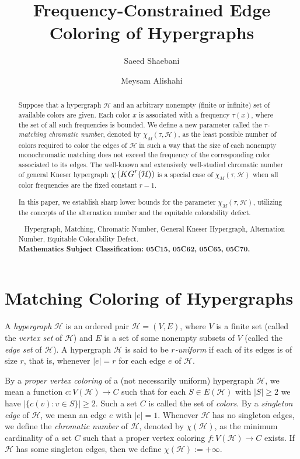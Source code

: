 \documentclass[11pt]{amsart}
\title{Frequency-Constrained Edge Coloring of Hypergraphs}
\author{Saeed Shaebani}
\author{Meysam Alishahi}
\theoremstyle{definition}
\begin{document}
\begin{abstract}
\noindent Suppose that a hypergraph ${\mathcal H}$ and an arbitrary nonempty (finite or infinite) set of available colors are given.
Each color $x$ is associated with a frequency $\tau (x)$, where the set of all such frequencies is bounded.
We define a new parameter called the 
{\it $\tau$-matching chromatic number}, denoted by $\chi_M(\tau, {\mathcal H})$,
as the least possible number of colors required to color the edges of
${\mathcal H}$ in such a way that the size of each nonempty monochromatic matching does not exceed the frequency of the corresponding color associated to its edges.
The well-known and extensively well-studied chromatic number of general Kneser hypergraph $\chi \left( {\rm KG}^r({\mathcal H}) \right)$ is a special case of $\chi_M(\tau, {\mathcal H})$ when all color frequencies are the fixed constant $r-1$.

In this paper, we establish sharp lower bounds for the parameter
$\chi_M(\tau , {\mathcal H})$, utilizing the concepts of the alternation number and the equitable colorability defect.

\ { Hypergraph, Matching, Chromatic Number, General Kneser Hypergraph, Alternation Number, Equitable Colorability Defect.}\\
{\bf Mathematics Subject Classification: 05C15, 05C62, 05C65, 05C70.}
\end{abstract}

\maketitle
\section{{\bf Matching Coloring of Hypergraphs}}


A {\it hypergraph} ${\mathcal H}$ is an ordered pair ${\mathcal H}=(V,E)$, where $V$ is a finite set (called the {\it vertex set} of ${\mathcal H}$) and $E$ is a set of some nonempty subsets of $V$ (called the {\it edge set} of ${\mathcal H}$). A hypergraph ${\mathcal H}$ is said to be {\it $r$-uniform} if each of its edges is of size $r$, that is, whenever $|e| = r$ for each edge $e$ of ${\mathcal H}$.

By a {\it proper vertex coloring} of a (not necessarily uniform) hypergraph ${\mathcal H}$, we mean a function
$c:V({\mathcal H}) \rightarrow C$ such that for each $S\in E({\mathcal H})$ with $|S|\geq 2$ we have $|\{c(v) : v\in S\}| \geq 2$. Such a set $C$ is called the set of {\it colors}. By a {\it singleton edge} of ${\mathcal H}$, we mean an edge $e$ with $|e|=1$. Whenever ${\mathcal H}$ has no singleton edges, we define the {\it chromatic number} of ${\mathcal H}$, denoted by $\chi ({\mathcal H})$, as the minimum cardinality of a set $C$ such that a proper vertex coloring $f:V({\mathcal H})\rightarrow C$ exists. If ${\mathcal H}$ has some singleton edges, then we define $\chi ({\mathcal H}) :=+\infty$.
\end{document}
